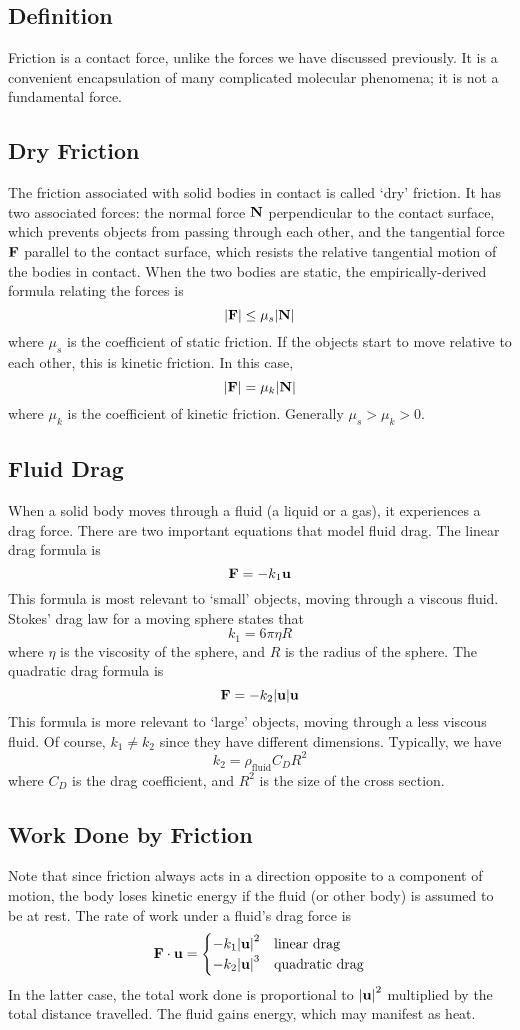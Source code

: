 \subsection{Definition}
Friction is a contact force, unlike the forces we have discussed previously.
It is a convenient encapsulation of many complicated molecular phenomena; it is not a fundamental force.

\subsection{Dry Friction}
The friction associated with solid bodies in contact is called `dry' friction.
It has two associated forces: the normal force \(\vb N\) perpendicular to the contact surface, which prevents objects from passing through each other, and the tangential force \(\vb F\) parallel to the contact surface, which resists the relative tangential motion of the bodies in contact.
When the two bodies are static, the empirically-derived formula relating the forces is
\[
	\abs{\vb F} \leq \mu_s \abs{\vb N}
\]
where \(\mu_s\) is the coefficient of static friction.
If the objects start to move relative to each other, this is kinetic friction.
In this case,
\[
	\abs{\vb F} = \mu_k \abs{\vb N}
\]
where \(\mu_k\) is the coefficient of kinetic friction.
Generally \(\mu_s > \mu_k > 0\).

\subsection{Fluid Drag}
When a solid body moves through a fluid (a liquid or a gas), it experiences a drag force.
There are two important equations that model fluid drag.
The linear drag formula is
\[
	\vb F = -k_1 \vb u
\]
This formula is most relevant to `small' objects, moving through a viscous fluid.
Stokes' drag law for a moving sphere states that
\[
	k_1 = 6 \pi \eta R
\]
where \(\eta\) is the viscosity of the sphere, and \(R\) is the radius of the sphere.
The quadratic drag formula is
\[
	\vb F = -k_2 \abs{\vb u} \vb u
\]
This formula is more relevant to `large' objects, moving through a less viscous fluid.
Of course, \(k_1 \neq k_2\) since they have different dimensions.
Typically, we have
\[
	k_2 = \rho_{\text{fluid}} C_D R^2
\]
where \(C_D\) is the drag coefficient, and \(R^2\) is the size of the cross section.

\subsection{Work Done by Friction}
Note that since friction always acts in a direction opposite to a component of motion, the body loses kinetic energy if the fluid (or other body) is assumed to be at rest.
The rate of work under a fluid's drag force is
\[
	\vb F \cdot \vb u = \begin{cases}
		-k_1 \abs{\vb u}^2 & \text{linear drag}    \\
		-k_2 \abs{\vb u}^3 & \text{quadratic drag}
	\end{cases}
\]
In the latter case, the total work done is proportional to \(\abs{\vb u}^2\) multiplied by the total distance travelled.
The fluid gains energy, which may manifest as heat.

